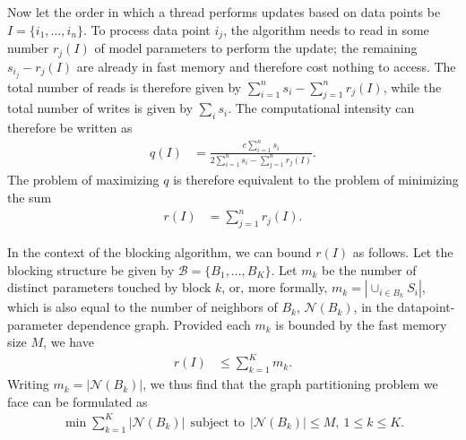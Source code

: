 \documentclass[times,11pt]{article}
\numberwithin{equation}{section}		%
\numberwithin{figure}{section}			%
\numberwithin{table}{section}				%
\newcommand{\blocks}{\mathcal{B}}
\newcommand{\neighs}[1]{\mathcal{N}\left({#1}\right)}
\begin{document}
Now let the order in which a thread performs updates based on data points be $I = \lbrace i_{1}, \dots, i_{n}\rbrace$. To process data point $i_{j}$, the
algorithm needs to read in some number $r_{j}\left(I\right)$ of model parameters to perform the update; the remaining $s_{i_j} - r_{j}\left(I\right)$ are
already in fast memory and therefore cost nothing to access. The total number of reads is therefore given by $\sum_{i = 1}^{n} s_{i} - \sum_{j = 1}^{n} r_{j}\left(I\right)$, while the total number of writes is given by $\sum_{i} s_i$. The computational intensity can therefore be written as
\begin{align}
q\left(I\right) & = \frac{c\sum_{i = 1}^{n} s_{i}}{2\sum_{i = 1}^{n} s_{i} - \sum_{j = 1}^{n} r_{j}\left(I\right)} . 
\end{align}
The problem of maximizing $q$ is therefore equivalent to the problem of minimizing the sum
\begin{align}
r\left(I\right) & = \sum_{j = 1}^{n} r_{j}\left(I\right) . 
\end{align}

In the context of the blocking algorithm, we can bound $r\left(I\right)$ as follows. Let the blocking structure be given by $\blocks = \lbrace B_{1}, \dots, B_{K} \rbrace$. Let $m_{k}$ be the number of distinct parameters touched by block $k$, or, more formally, $m_{k} = \left|\cup_{i \in B_{k}} S_{i}\right|$, which is also
equal to the number of neighbors of $B_{k}$, $\neighs{B_{k}}$, in the datapoint-parameter dependence graph. Provided each $m_{k}$ is bounded by the fast memory size $M$, we have
\begin{align}
r\left(I\right) & \leq \sum_{k = 1}^{K} m_{k} . 
\end{align}
Writing $m_{k} = \left|\neighs{B_{k}}\right|$, we thus find that the graph partitioning problem we face can be formulated as
\begin{align}\label{eq:comb-opt}
\min \sum_{k = 1}^{K} \left|\neighs{B_{k}}\right| ~~ \text{subject to}~~ \left|\neighs{B_{k}}\right| \leq M,~ 1 \leq k \leq K .
\end{align}
\end{document}
